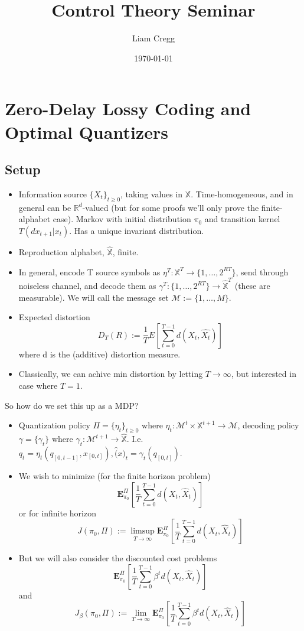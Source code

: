\documentclass{article}
\title{Control Theory Seminar}
\date{\today}
\author{Liam Cregg}
\begin{document}
\begin{titlepage}
    \maketitle
\end{titlepage}

\newpage

\section{Zero-Delay Lossy Coding and Optimal Quantizers}
\subsection{Setup}
\begin{itemize}
    \item Information source \( \{X_t\}_{t\ge0} \), taking values in \(\mathbb{X}\). Time-homogeneous, and in general can be \(\mathbb{R}^d\)-valued (but for some proofs we'll only prove the finite-alphabet case). Markov with initial distribution \(\pi_0\) and transition kernel \(T(dx_{t+1} | x_t)\). Has a unique invariant distribution.
    \item Reproduction alphabet, \(\hat{\mathbb{X}}\), finite.
    \item In general, encode T source symbols as \(\eta^T : \mathbb{X}^T \to \{1,\ldots,2^{RT}\} \), send through noiseless channel, and decode them as \( \gamma^T : \{1,\ldots,2^{RT}\} \to \hat{\mathbb{X}}^T \) (these are measurable). We will call the message set \( \mathcal{M} := \{1,\ldots,M\} \).
    \item Expected distortion \[ D_T(R) := \frac{1}{T} E[\sum_{t=0}^{T-1}d(X_t,\hat{X_t})]\] where d is the (additive) distortion measure.
    \item Classically, we can achive min distortion by letting \(T \to \infty\), but interested in case where \(T=1\).
\end{itemize}

So how do we set this up as a MDP?
\begin{itemize}
    \item Quantization policy \( \Pi = \{\eta_t\}_{t \ge 0} \) where \( \eta_t : \mathcal{M}^t \times \mathbb{X}^{t+1} \to \mathcal{M} \), decoding policy \(\gamma = \{\gamma_t\}\) where \( \gamma_t : \mathcal{M}^{t+1} \to \hat{\mathbb{X}} \). I.e. \( q_t = \eta_t(q_{[0,t-1]},x_{[0,t]}), \hat(x)_t = \gamma_t(q_{[0,t]}) \).
    \item We wish to minimize (for the finite horizon problem)
          \[ \mathbf{E}_{\pi_0}^{\Pi}\left[\frac{1}{T}\sum_{t=0}^{T-1}d(X_t,\hat{X}_t)\right] \]
          or for infinite horizon
          \[ J(\pi_0,\Pi) := \limsup_{T\to\infty}\mathbf{E}_{\pi_0}^{\Pi}\left[\frac{1}{T}\sum_{t=0}^{T-1}d(X_t,\hat{X}_t)\right] \]
    \item But we will also consider the discounted cost problems
          \[ \mathbf{E}_{\pi_0}^{\Pi}\left[\frac{1}{T}\sum_{t=0}^{T-1}\beta^td(X_t,\hat{X}_t)\right] \]
          and
          \[ J_\beta(\pi_0,\Pi) := \lim_{T\to\infty}\mathbf{E}_{\pi_0}^{\Pi}\left[\frac{1}{T}\sum_{t=0}^{T-1}\beta^td(X_t,\hat{X}_t)\right] \]
\end{itemize}
\end{document}
